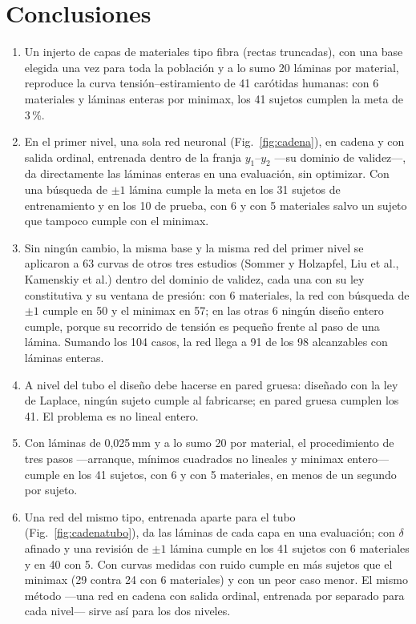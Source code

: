 \section{Conclusiones}
\begin{enumerate}
\item Un injerto de capas de materiales tipo fibra (rectas truncadas), con una base elegida una vez para toda la población y a lo sumo 20 láminas por material, reproduce la curva tensión--estiramiento de 41 carótidas humanas: con 6 materiales y láminas enteras por minimax, los 41 sujetos cumplen la meta de 3\,\%.
\item En el primer nivel, una sola red neuronal (Fig.~\ref{fig:cadena}), en cadena y con salida ordinal, entrenada dentro de la franja $y_1$--$y_2$ ---su dominio de validez---, da directamente las láminas enteras en una evaluación, sin optimizar. Con una búsqueda de $\pm1$ lámina cumple la meta en los 31 sujetos de entrenamiento y en los 10 de prueba, con 6 y con 5 materiales salvo un sujeto que tampoco cumple con el minimax.
\item Sin ningún cambio, la misma base y la misma red del primer nivel se aplicaron a 63 curvas de otros tres estudios (Sommer y Holzapfel, Liu et al., Kamenskiy et al.) dentro del dominio de validez, cada una con su ley constitutiva y su ventana de presión: con 6 materiales, la red con búsqueda de $\pm1$ cumple en 50 y el minimax en 57; en las otras 6 ningún diseño entero cumple, porque su recorrido de tensión es pequeño frente al paso de una lámina. Sumando los 104 casos, la red llega a 91 de los 98 alcanzables con láminas enteras.
\item A nivel del tubo el diseño debe hacerse en pared gruesa: diseñado con la ley de Laplace, ningún sujeto cumple al fabricarse; en pared gruesa cumplen los 41. El problema es no lineal entero.
\item Con láminas de 0,025\,mm y a lo sumo 20 por material, el procedimiento de tres pasos ---arranque, mínimos cuadrados no lineales y minimax entero--- cumple en los 41 sujetos, con 6 y con 5 materiales, en menos de un segundo por sujeto.
\item Una red del mismo tipo, entrenada aparte para el tubo (Fig.~\ref{fig:cadenatubo}), da las láminas de cada capa en una evaluación; con $\delta$ afinado y una revisión de $\pm1$ lámina cumple en los 41 sujetos con 6 materiales y en 40 con 5. Con curvas medidas con ruido cumple en más sujetos que el minimax (29 contra 24 con 6 materiales) y con un peor caso menor. El mismo método ---una red en cadena con salida ordinal, entrenada por separado para cada nivel--- sirve así para los dos niveles.
\end{enumerate}
